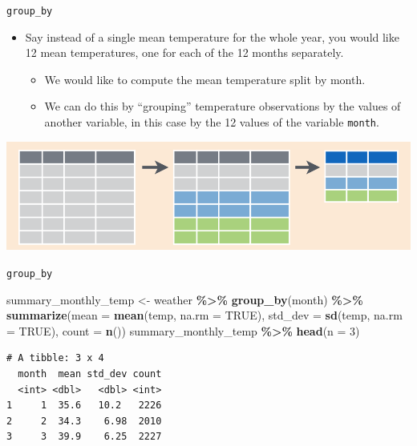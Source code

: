 \documentclass[
  ignorenonframetext,
]{beamer}
\newenvironment{Shaded}{\begin{snugshade}}{\end{snugshade}}
\newcommand{\AttributeTok}[1]{\textcolor[rgb]{0.13,0.29,0.53}{#1}}
\newcommand{\ConstantTok}[1]{\textcolor[rgb]{0.56,0.35,0.01}{#1}}
\newcommand{\DecValTok}[1]{\textcolor[rgb]{0.00,0.00,0.81}{#1}}
\newcommand{\FunctionTok}[1]{\textcolor[rgb]{0.13,0.29,0.53}{\textbf{#1}}}
\newcommand{\NormalTok}[1]{#1}
\newcommand{\OtherTok}[1]{\textcolor[rgb]{0.56,0.35,0.01}{#1}}
\newcommand{\SpecialCharTok}[1]{\textcolor[rgb]{0.81,0.36,0.00}{\textbf{#1}}}
\providecommand{\tightlist}{%
  \setlength{\itemsep}{0pt}\setlength{\parskip}{0pt}}
\begin{document}
\begin{frame}[fragile]{\texttt{group\_by}}
\protect\hypertarget{group_by}{}
\begin{itemize}
\item
  Say instead of a single mean temperature for the whole year, you would
  like 12 mean temperatures, one for each of the 12 months separately.

  \begin{itemize}
  \tightlist
  \item
    We would like to compute the mean temperature split by month.
  \item
    We can do this by ``grouping'' temperature observations by the
    values of another variable, in this case by the 12 values of the
    variable \texttt{month}.
  \end{itemize}
\end{itemize}

\begin{center}\includegraphics[width=0.8\linewidth,height=0.4\textheight]{week3_3} \end{center}
\end{frame}

\begin{frame}[fragile]{\texttt{group\_by}}
\protect\hypertarget{group_by-1}{}
\normalsize

\begin{Shaded}
\begin{Highlighting}[]
\NormalTok{summary\_monthly\_temp }\OtherTok{\textless{}{-}}\NormalTok{ weather }\SpecialCharTok{\%\textgreater{}\%} 
  \FunctionTok{group\_by}\NormalTok{(month) }\SpecialCharTok{\%\textgreater{}\%} 
  \FunctionTok{summarize}\NormalTok{(}\AttributeTok{mean =} \FunctionTok{mean}\NormalTok{(temp, }\AttributeTok{na.rm =} \ConstantTok{TRUE}\NormalTok{), }
            \AttributeTok{std\_dev =} \FunctionTok{sd}\NormalTok{(temp, }\AttributeTok{na.rm =} \ConstantTok{TRUE}\NormalTok{),}
            \AttributeTok{count =} \FunctionTok{n}\NormalTok{())}
\NormalTok{summary\_monthly\_temp }\SpecialCharTok{\%\textgreater{}\%} \FunctionTok{head}\NormalTok{(}\AttributeTok{n =} \DecValTok{3}\NormalTok{)}
\end{Highlighting}
\end{Shaded}

\begin{verbatim}
# A tibble: 3 x 4
  month  mean std_dev count
  <int> <dbl>   <dbl> <int>
1     1  35.6   10.2   2226
2     2  34.3    6.98  2010
3     3  39.9    6.25  2227
\end{verbatim}

\normalsize
\end{frame}
\end{document}
